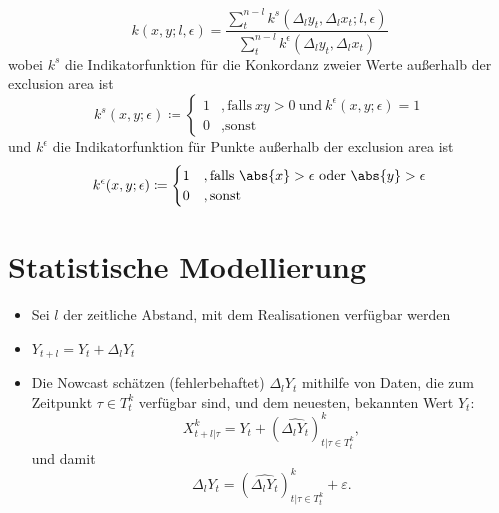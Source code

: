 \documentclass{article}
\theoremstyle{plain}%
\theoremstyle{definition}
\newcommand{\lag}[1][l]{\Delta_{#1}}
\DeclarePairedDelimiter{\abs}\lvert\rvert
\begin{document}
\begin{itemize}
\begin{equation}
  		k (x, y; l, \epsilon) = \frac{\sum_{t}^{n-l} k^s (\lag y_t, \lag x_t; l, \epsilon)}{\sum_{t}^{n-l} k^\epsilon (\lag y_t, \lag x_t)}
	\end{equation}
	wobei $k^s$ die Indikatorfunktion für die Konkordanz zweier Werte außerhalb der exclusion area ist 
	\begin{equation}
  		k^s (x, y; \epsilon) \coloneqq \begin{cases}
  			1 &, \text{falls}\ xy > 0\ \text{und}\ k^\epsilon(x, y; \epsilon) = 1\\
  			0 &, \text{sonst}
  		\end{cases}
	\end{equation}
	und $k^\epsilon$ die Indikatorfunktion für Punkte außerhalb der exclusion area ist
	\begin{equation}
  		k^\epsilon (x, y; \epsilon) \coloneqq \begin{cases}
  			1 &, \text{falls} \ \abs{x} > \epsilon \text{oder} \ \abs{y} > \epsilon \\
  			0 &, \text{sonst}
  		\end{cases}
	\end{equation}
\end{itemize}

		
\section{Statistische Modellierung}

\begin{itemize}
  \item Sei $l$ der zeitliche Abstand, mit dem Realisationen verfügbar werden
  \item $Y_{t + l} = Y_t + \lag Y_t$
  \item Die Nowcast schätzen (fehlerbehaftet) $\lag Y_t$ mithilfe von Daten, die zum Zeitpunkt $\tau \in T_t^k$ verfügbar sind, und dem neuesten, bekannten Wert $Y_t$:
	\begin{equation}
  		X_{t+l \lvert \tau}^k = Y_t + (\widehat{\lag Y_t})_{t \lvert \tau \in T_t^k}^k,
	\end{equation}
	und damit 
		\begin{equation}
  			\lag Y_t = (\widehat{\lag Y_t})_{t \lvert \tau \in T_t^k}^k + \varepsilon.
		\end{equation}


\end{itemize}
\end{document}
